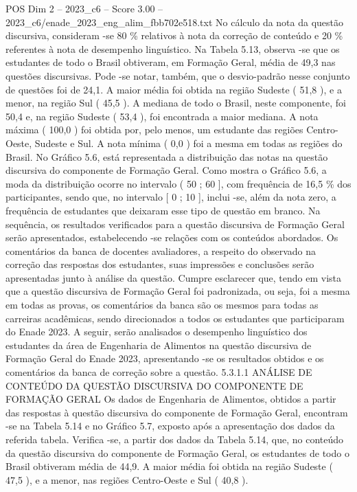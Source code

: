 \begin{textsample}{POS Dim 2 – 2023\_c6 – Score 3.00 – 2023\_c6/enade\_2023\_eng\_alim\_fbb702e518.txt}
No cálculo da nota da questão discursiva, consideram -se 80 \% relativos à nota da correção de conteúdo e 20 \% referentes à nota de desempenho linguístico.
Na Tabela 5.13, observa -se que os estudantes de todo o Brasil obtiveram, em Formação Geral, média de 49,3 nas questões discursivas.
Pode -se notar, também, que o desvio-padrão nesse conjunto de questões foi de 24,1.
A maior média foi obtida na região Sudeste ( 51,8 ), e a menor, na região Sul ( 45,5 ).
A mediana de todo o Brasil, neste componente, foi 50,4 e, na região Sudeste ( 53,4 ), foi encontrada a maior mediana.
A nota máxima ( 100,0 ) foi obtida por, pelo menos, um estudante das regiões Centro-Oeste, Sudeste e Sul.
A nota mínima ( 0,0 ) foi a mesma em todas as regiões do Brasil.
No Gráfico 5.6, está representada a distribuição das notas na questão discursiva do componente de Formação Geral.
Como mostra o Gráfico 5.6, a moda da distribuição ocorre no intervalo ( 50 ; 60 ], com frequência de 16,5 \% dos participantes, sendo que, no intervalo [ 0 ; 10 ], inclui -se, além da nota zero, a frequência de estudantes que deixaram esse tipo de questão em branco.
Na sequência, os resultados verificados para a questão discursiva de Formação Geral serão apresentados, estabelecendo -se relações com os conteúdos abordados.
Os comentários da banca de docentes avaliadores, a respeito do observado na correção das respostas dos estudantes, suas impressões e conclusões serão apresentadas junto à análise da questão.
Cumpre esclarecer que, tendo em vista que a questão discursiva de Formação Geral foi padronizada, ou seja, foi a mesma em todas as provas, os comentários da banca são os mesmos para todas as carreiras acadêmicas, sendo direcionados a todos os estudantes que participaram do Enade 2023.
A seguir, serão analisados o desempenho linguístico dos estudantes da área de Engenharia de Alimentos na questão discursiva de Formação Geral do Enade 2023, apresentando -se os resultados obtidos e os comentários da banca de correção sobre a questão. 5.3.1.1 ANÁLISE DE CONTEÚDO DA QUESTÃO DISCURSIVA DO COMPONENTE DE FORMAÇÃO GERAL Os dados de Engenharia de Alimentos, obtidos a partir das respostas à questão discursiva do componente de Formação Geral, encontram -se na Tabela 5.14 e no Gráfico 5.7, exposto após a apresentação dos dados da referida tabela.
Verifica -se, a partir dos dados da Tabela 5.14, que, no conteúdo da questão discursiva do componente de Formação Geral, os estudantes de todo o Brasil obtiveram média de 44,9.
A maior média foi obtida na região Sudeste ( 47,5 ), e a menor, nas regiões Centro-Oeste e Sul ( 40,8 ).

\end{textsample}
